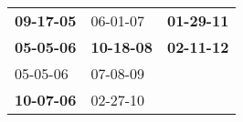 \begin{supertabular}{p{0.33\columnwidth}p{0.33\columnwidth}p{0.33\columnwidth}}
 \textbf{09-17-05\textsuperscript{}} &           06-01-07\textsuperscript{} &  \textbf{01-29-11\textsuperscript{}} \\
 \textbf{05-05-06\textsuperscript{}} &  \textbf{10-18-08\textsuperscript{}} &  \textbf{02-11-12\textsuperscript{}} \\
          05-05-06\textsuperscript{} &           07-08-09\textsuperscript{} &                                      \\
 \textbf{10-07-06\textsuperscript{}} &           02-27-10\textsuperscript{} &                                      \\
\end{supertabular}
